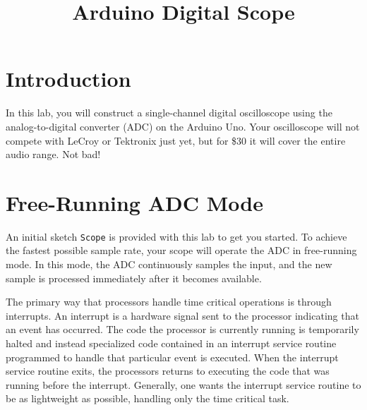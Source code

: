 \documentclass[12pt]{article}
\begin{document}
\title{Arduino Digital Scope} 

\maketitle

\section{Introduction}

In this lab, you will construct a single-channel digital oscilloscope using the analog-to-digital converter (ADC) on the Arduino Uno.  Your oscilloscope will not compete with LeCroy or Tektronix just yet, but for \$30 it will cover the entire audio range.  Not bad!

\section{Free-Running ADC Mode}

An initial sketch {\tt Scope} is provided with this lab to get you started.  To achieve the fastest possible sample rate, your scope will operate the ADC in free-running mode.  In this mode, the ADC continuously samples the input, and the new sample is processed immediately after it becomes available.

The primary way that processors handle time critical operations is through interrupts.  An interrupt is a hardware signal sent to the processor indicating that an event has occurred.  The code the processor is currently running is temporarily halted and instead specialized code contained in an interrupt service routine programmed to handle that particular event is executed.   When the interrupt service routine exits, the processors returns to executing the code that was running before the interrupt.   Generally, one wants the interrupt service routine to be as lightweight as possible, handling only the time critical task.
\end{document}
